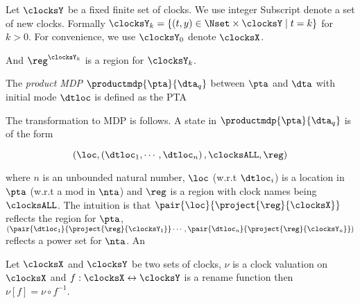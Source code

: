 Let $\clocksY$ be a fixed finite set of clocks. We use integer Subscript denote a set of 
new clocks. Formally
$
    \clocksY_k = \left \{
        \left (
            t,y
        \right ) \in \Nset \times \clocksY
        \mid
        t = k
    \right \}
$ for $ k > 0 $.
For convenience, we use $ \clocksY_0 $ denote $ \clocksX $.

And $\reg^{\clocksY_k}$ is a region for $\clocksY_k$.
\begin{definition}
The \emph{product MDP} $\productmdp{\pta}{\dta_q}$ between $\pta$ and $\dta$ with initial mode $\dtloc$ is defined as the PTA

\newcommand{\clocksN}{
    \clocksX \cup \left(
        \bigcup_{k=1}^{n} \clocksY_k
    \right )
}

The transformation to MDP is follows. A state in $\productmdp{\pta}{\dta_q}$ 
is of the form 

\begin{equation}\label{eq:state0}
    \left (
        \loc
        ,
        \left (
            \dtloc_1,
            \cdots,
            \dtloc_n
        \right )
        ,
        \clocksALL
        ,
        \reg
    \right )
\end{equation}

where $n$ is an unbounded natural number, $\loc$ (w.r.t $\dtloc_i$) is a location in $\pta$ 
(w.r.t a mod in $\nta$) and $\reg$ is a region with clock names being $\clocksALL$.
The intuition is that 
$
\pair
    {\loc}
    {\project{\reg}{\clocksX}}
$ 
reflects the region for $\pta$,
$ 
\left (
    \pair
        {\dtloc_1}
        {\project{\reg}{\clocksY_1}}
    \cdots,
    \pair
        {\dtloc_n}
        {\project{\reg}{\clocksY_n}}
\right )
$
reflects a power set for $\nta$. An
\end{definition}
% 
% 
\begin{definition}
Let $\clocksX$ and $\clocksY$ be two sets of clocks, $\nu$ is a clock valuation on $\clocksX$ and
$ f:\clocksX \leftrightarrow \clocksY $ is a rename function then $ \nu[f]=\nu \circ f^{-1} $.
% 
\end{definition}
